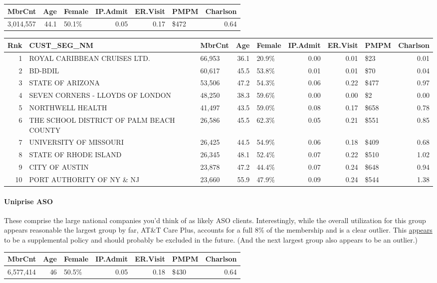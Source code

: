 \documentclass[]{article}
\let\oldparagraph\paragraph
\renewcommand{\paragraph}[1]{\oldparagraph{#1}\mbox{}}
\begin{document}
\begin{longtable}[]{@{}lrlrrlr@{}}
\toprule
MbrCnt & Age & Female & IP.Admit & ER.Visit & PMPM &
Charlson\tabularnewline
\midrule
\endhead
3,014,557 & 44.1 & 50.1\% & 0.05 & 0.17 & \$472 & 0.64\tabularnewline
\bottomrule
\end{longtable}

\begin{longtable}[]{@{}rllrlrrlr@{}}
\toprule
Rnk & CUST\_SEG\_NM & MbrCnt & Age & Female & IP.Admit & ER.Visit & PMPM
& Charlson\tabularnewline
\midrule
\endhead
1 & ROYAL CARIBBEAN CRUISES LTD. & 66,953 & 36.1 & 20.9\% & 0.00 & 0.01
& \$23 & 0.01\tabularnewline
2 & BD-BDIL & 60,617 & 45.5 & 53.8\% & 0.01 & 0.01 & \$70 &
0.04\tabularnewline
3 & STATE OF ARIZONA & 53,506 & 47.2 & 54.3\% & 0.06 & 0.22 & \$477 &
0.97\tabularnewline
4 & SEVEN CORNERS - LLOYDS OF LONDON & 48,250 & 38.3 & 59.6\% & 0.00 &
0.00 & \$2 & 0.00\tabularnewline
5 & NORTHWELL HEALTH & 41,497 & 43.5 & 59.0\% & 0.08 & 0.17 & \$658 &
0.78\tabularnewline
6 & THE SCHOOL DISTRICT OF PALM BEACH COUNTY & 26,586 & 45.5 & 62.3\% &
0.05 & 0.21 & \$551 & 0.85\tabularnewline
7 & UNIVERSITY OF MISSOURI & 26,425 & 44.5 & 54.9\% & 0.06 & 0.18 &
\$409 & 0.68\tabularnewline
8 & STATE OF RHODE ISLAND & 26,345 & 48.1 & 52.4\% & 0.07 & 0.22 & \$510
& 1.02\tabularnewline
9 & CITY OF AUSTIN & 23,878 & 47.2 & 44.4\% & 0.07 & 0.24 & \$648 &
0.94\tabularnewline
10 & PORT AUTHORITY OF NY \& NJ & 23,660 & 55.9 & 47.9\% & 0.09 & 0.24 &
\$544 & 1.38\tabularnewline
\bottomrule
\end{longtable}

\paragraph{Uniprise ASO}\label{uniprise-aso}

These comprise the large national companies you'd think of as likely ASO
clients. Interestingly, while the overall utilization for this group
appears reasonable the largest group by far, AT\&T Care Plus, accounts
for a full 8\% of the membership and is a clear outlier. This
\href{https://careplus.att.com/}{appears} to be a supplemental policy
and should probably be excluded in the future. (And the next largest
group also appears to be an outlier.)

\begin{longtable}[]{@{}lrlrrlr@{}}
\toprule
MbrCnt & Age & Female & IP.Admit & ER.Visit & PMPM &
Charlson\tabularnewline
\midrule
\endhead
6,577,414 & 46 & 50.5\% & 0.05 & 0.18 & \$430 & 0.64\tabularnewline
\bottomrule
\end{longtable}
\end{document}
